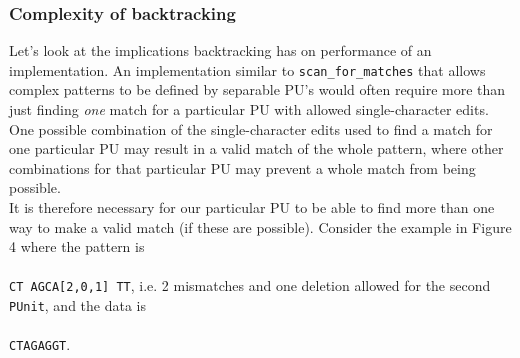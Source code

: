 \documentclass[12pt]{article}
\newcommand{\scm}{\texttt{scan\_for\_matches} }
\newcommand{\pu}{PU }
\newcommand{\pus}{PU's }
\begin{document}
\subsubsection{Complexity of backtracking}
Let's look at the implications backtracking has on performance of an implementation. An implementation similar to
\scm that allows complex patterns to be defined by separable \pus would often require more than just finding \textit{one}
match for a particular \pu with allowed single-character edits. One possible combination of the single-character
edits used to find a match for one particular \pu may result in a valid match of the whole pattern, 
where other combinations for that particular \pu may prevent a whole match from being possible. \\
It is therefore necessary for our particular \pu to be able to find more than one way to make a valid match (if these are
possible). Consider the example in Figure 4 where the pattern is \\ \\
\texttt{CT\; AGCA[2,0,1]\; TT}, i.e. 2 mismatches and
one deletion allowed for the second \texttt{PUnit}, and the data is \\ \\
\texttt{CTAGAGGT}. 
\end{document}

